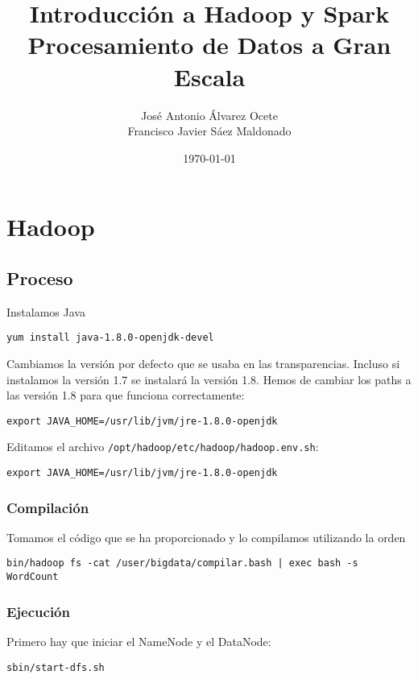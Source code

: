 \documentclass[11pt]{article}
\author{José Antonio Álvarez Ocete\\ Francisco Javier Sáez Maldonado}
\date{\today}
\title{Introducción a Hadoop y Spark\\\medskip
\large Procesamiento de Datos a Gran Escala}
\def\inline{\lstinline[basicstyle=\ttfamily,keywordstyle={}]}
\begin{document}
\maketitle

\tableofcontents

\section{Hadoop}

\subsection{Proceso}

Instalamos Java


\begin{verbatim}
yum install java-1.8.0-openjdk-devel
\end{verbatim}

Cambiamos la versión por defecto que se usaba en las transparencias. Incluso si instalamos la versión 1.7 se instalará la versión 1.8. Hemos de cambiar los paths a las versión 1.8 para que funciona correctamente:
\begin{verbatim}
export JAVA_HOME=/usr/lib/jvm/jre-1.8.0-openjdk
\end{verbatim}

Editamos el archivo  \inline{/opt/hadoop/etc/hadoop/hadoop.env.sh}:
\begin{verbatim}
export JAVA_HOME=/usr/lib/jvm/jre-1.8.0-openjdk
\end{verbatim}



\subsubsection*{ Compilación}

Tomamos el código que se ha proporcionado y lo compilamos utilizando la orden

\begin{verbatim}
bin/hadoop fs -cat /user/bigdata/compilar.bash | exec bash -s WordCount
\end{verbatim}

\subsubsection*{ Ejecución }

Primero hay que iniciar el NameNode y el DataNode:
\begin{verbatim}
sbin/start-dfs.sh
\end{verbatim}
\end{document}
